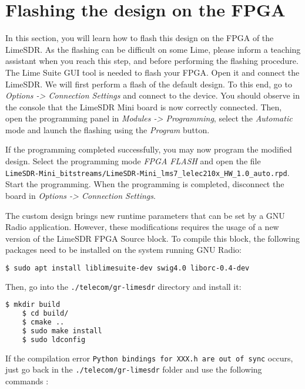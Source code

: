 


\section{Flashing the design on the FPGA}

 In this section, you will learn how to flash this design on the FPGA of the LimeSDR. As the flashing can be difficult on some Lime, please inform a teaching assistant when you reach this step, and before performing the flashing procedure. The Lime Suite GUI tool is needed to flash your FPGA. Open it and connect the LimeSDR. We will first perform a flash of the default design. To this end, go to \textit{Options -> Connection Settings} and connect to the device. You should observe in the console that the LimeSDR Mini board is now correctly connected. Then, open the programming panel in \textit{Modules -> Programming}, select the \textit{Automatic} mode and launch the flashing using the \textit{Program} button.

If the programming completed successfully, you may now program the modified design. Select the programming mode \textit{FPGA FLASH} and open the file \\ \texttt{LimeSDR-Mini\_bitstreams/LimeSDR-Mini\_lms7\_lelec210x\_HW\_1.0\_auto.rpd}. Start the programming. When the programming is completed, disconnect the board in \textit{Options -> Connection Settings}.

The custom design brings new runtime parameters that can be set by a GNU Radio application. However, these modifications requires the usage of a new version of the LimeSDR FPGA Source block. To compile this block, the following packages need to be installed on the system running GNU Radio:
\begin{lstlisting}[language=bash, keepspaces=true, columns=fullflexible]
    $ sudo apt install liblimesuite-dev swig4.0 liborc-0.4-dev
\end{lstlisting}
Then, go into the \texttt{./telecom/gr-limesdr} directory and install it:
\begin{lstlisting}[language=bash, keepspaces=true, columns=fullflexible]
    $ mkdir build
    $ cd build/
    $ cmake ..
    $ sudo make install
    $ sudo ldconfig
\end{lstlisting}

If the compilation error \texttt{Python bindings for XXX.h are out of sync} occurs, just go back in the \texttt{./telecom/gr-limesdr} folder and use the following commands :

